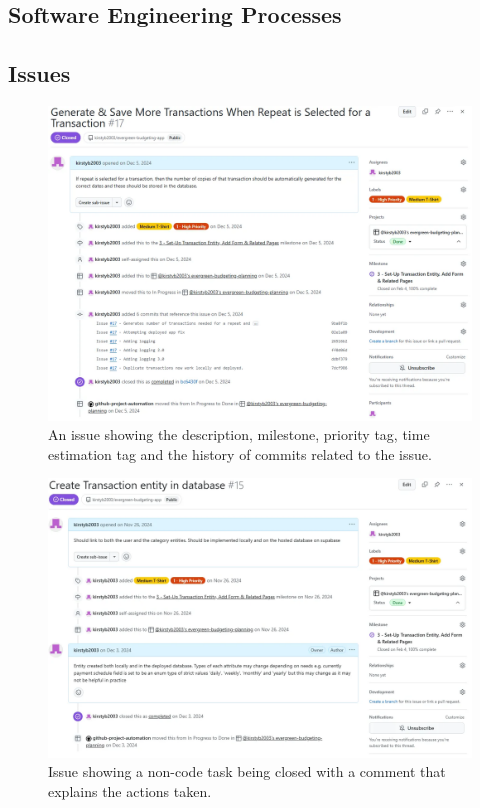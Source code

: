 \documentclass{l4proj}
\begin{document}
\begin{appendices}
\chapter{Software Engineering Processes}
\section{Issues}
\label{app:issues}
\begin{figure}[h]
    \centering
    \includegraphics[width=0.75\linewidth]{images/GitHub-Screenshots/issue-commit-messages.png}
    \caption{An issue showing the description, milestone, priority tag, time estimation tag and the history of commits related to the issue.}
    \label{fig:issue}
\end{figure}

\begin{figure}[h]
    \centering
    \includegraphics[width=0.9\linewidth]{images/GitHub-Screenshots/issue-closing-comment.png}
    \caption{Issue showing a non-code task being closed with a comment that explains the actions taken.}
    \label{fig:enter-label}
\end{figure}


\end{appendices}
\end{document}
